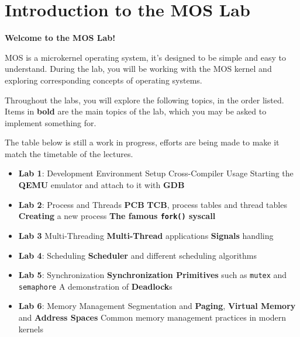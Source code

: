 \chapter*{Introduction to the MOS Lab}

\textbf{Welcome to the MOS Lab!}

MOS is a microkernel operating system, it's designed to be simple and easy to understand.
During the lab, you will be working with the MOS kernel and exploring corresponding concepts of
operating systems.

Throughout the labs, you will explore the following topics, in the order listed. Items in
\textbf{bold} are the main topics of the lab, which you may be asked to implement something for.

\begin{warning}
    \item The table below is still a work in progress, efforts are being made to make it match the
    timetable of the lectures.
\end{warning}

\begin{itemize}
    \item \textbf{Lab 1}: Development Environment Setup
          \subitem Cross-Compiler Usage
          \subitem Starting the \textbf{QEMU} emulator and attach to it with \textbf{GDB}
    \item \textbf{Lab 2}: Process and Threads
          \subitem \textbf{PCB} \textbf{TCB}, process tables and thread tables
          \subitem \textbf{Creating} a new process
          \subitem \textbf{The famous \texttt{fork()} syscall}
    \item \textbf{Lab 3} Multi-Threading
          \subitem \textbf{Multi-Thread} applications
          \subitem \textbf{Signals} handling
    \item \textbf{Lab 4}: Scheduling
          \subitem \textbf{Scheduler} and different scheduling algorithms
    \item \textbf{Lab 5}: Synchronization
          \subitem \textbf{Synchronization Primitives} such as \texttt{mutex} and \texttt{semaphore}
          \subitem A demonstration of \textbf{Deadlock}s
    \item \textbf{Lab 6}: Memory Management
          \subitem Segmentation and \textbf{Paging}, \textbf{Virtual Memory} and \textbf{Address Spaces}
          \subitem Common memory management practices in modern kernels
\end{itemize}
